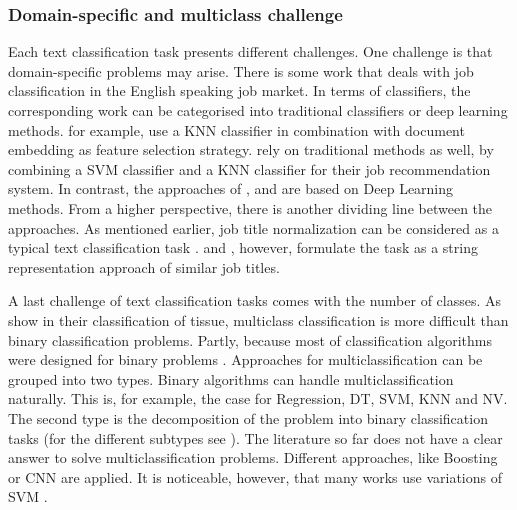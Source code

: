 \documentclass[12pt, a4paper, titlepage]{article}
\begin{document}
\subsubsection*{Domain-specific and multiclass challenge}
Each text classification task presents different challenges. One challenge is that domain-specific problems may arise. There is some work that deals with job classification in the English speaking job market. 
In terms of classifiers, the corresponding work can be categorised into traditional classifiers or deep learning methods. \cite{Zhu2017} for example, use a KNN classifier in combination with document embedding as feature selection strategy. \cite{Javed2015} rely on traditional methods as well, by combining a SVM classifier and a KNN classifier for their job recommendation system. In contrast, the approaches of \cite{Decorte2021}, \cite{WangJ2019} and \cite{Neculoiu2016} are based on Deep Learning methods. From a higher perspective, there is another dividing line between the approaches. As mentioned earlier, job title normalization can be considered as a typical text classification task \citep{WangJ2019, Javed2015, Zhu2017}. \cite{Decorte2021} and \cite{Neculoiu2016}, however, formulate the task as a string representation approach of similar job titles.  

A last challenge of text classification tasks comes with the number of classes. As \cite{Li2004} show in their classification of tissue, multiclass classification is more difficult than binary classification problems. Partly, because most of classification algorithms were designed for binary problems \citep{Aly2005}. Approaches for multiclassification can be grouped into two types. Binary algorithms can handle multiclassification naturally. This is, for example, the case for Regression, DT, SVM, KNN and NV. The second type is the decomposition of the problem into binary classification tasks (for the different subtypes see \cite{Aly2005}). The literature so far does not have a clear answer to solve multiclassification problems. Different approaches, like Boosting \citep{Schapire2000} or CNN \citep{Farooq2017} are applied. It is noticeable, however, that many works use variations of SVM \citep{Guo2015,Tomar2015,Tang2019}.  
\end{document}

